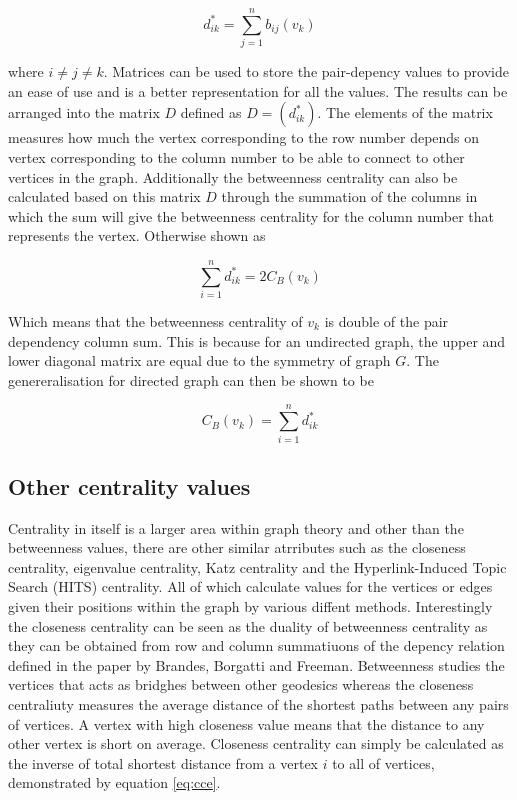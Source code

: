 \begin{equation}\label{eq:bcrmv}
d^*_{ik} = \sum_{j=1}^{n}b_{ij}(v_k)
\end{equation}

where $i \ne j \ne k$. Matrices can be used to store the pair-depency values to provide an ease of use and is a better representation for all the values. The results can be arranged into the matrix $D$ defined as $D = (d^*_{ik})$. The elements of the matrix measures how much the vertex corresponding to the row number depends on vertex corresponding to the column number to be able to connect to other vertices in the graph. Additionally the betweenness centrality can also be calculated based on this matrix $D$ through the summation of the columns in which the sum will give the betweenness centrality for the column number that represents the vertex. Otherwise shown as

\begin{equation}
\sum_{i=1}^nd^*_{ik} = 2C_B(v_k)
\end{equation}

Which means that the betweenness centrality of $v_k$ is double of the pair dependency column sum\cite{white1994betweenness}. This is because for an undirected graph, the upper and lower diagonal matrix are equal due to the symmetry of graph $G$. The genereralisation for directed graph can then be shown to be

\begin{equation}
C_B(v_k) = \sum_{i=1}^nd^*_{ik}
\end{equation}

\subsection{Other centrality values}
Centrality in itself is a larger area within graph theory and other than the betweenness values, there are other similar atrributes such as the closeness centrality, eigenvalue centrality, Katz centrality\cite{katz1953new} and the Hyperlink-Induced Topic Search (HITS) centrality. All of which calculate values for the vertices or edges given their positions within the graph by various diffent methods. Interestingly the closeness centrality can be seen as the duality of betweenness centrality as they can be obtained from row and column summatiuons of the depency relation defined in the paper by Brandes, Borgatti and Freeman\cite{brandes2016maintaining}.
Betweenness studies the vertices that acts as bridghes between other geodesics whereas the closeness centraliuty measures the average distance of the shortest paths between any pairs of vertices. A vertex with high closeness value means that the distance to any other vertex is short on average. Closeness centrality\cite{brandes2007centrality} can simply be calculated as the inverse of total shortest distance from a vertex $i$ to all of vertices, demonstrated by equation \ref{eq:cce}.

